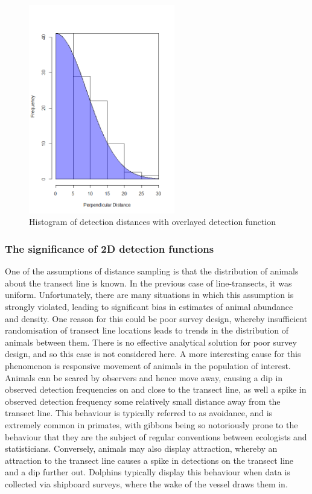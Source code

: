 \documentclass[11pt]{article}
\begin{document}
\begin{multicols}{2}
\begin{figure}[H]
\centering
\includegraphics[width=6.38cm]{DistHistDetec}
\caption{Histogram of detection distances with overlayed detection function}
\end{figure}

\subsubsection{The significance of 2D detection functions}

One of the assumptions of distance sampling is that the distribution of animals about the transect line is known. In the previous case of line-transects, it was uniform. Unfortunately, there are many situations in which this assumption is strongly violated, leading to significant bias in estimates of animal abundance and density. One reason for this could be poor survey design, whereby insufficient randomisation of transect line locations leads to trends in the distribution of animals between them. There is no effective analytical solution for poor survey design, and so this case is not considered here. A more interesting cause for this phenomenon is responsive movement of animals in the population of interest. Animals can be scared by observers and hence move away, causing a dip in observed detection frequencies on and close to the transect line, as well a spike in observed detection frequency some relatively small distance away from the transect line. This behaviour is typically referred to as avoidance, and is extremely common in primates, with gibbons being so notoriously prone to the behaviour that they are the subject of regular conventions between ecologists and statisticians. Conversely, animals may also display attraction, whereby an attraction to the transect line causes a spike in detections on the transect line and a dip further out. Dolphins typically display this behaviour when data is collected via shipboard surveys, where the wake of the vessel draws them in.


\end{multicols}
\end{document}
